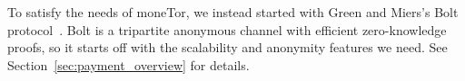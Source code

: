 To satisfy the needs of moneTor, we instead started with Green and Miers's Bolt protocol~\cite{green2017bolt}.
Bolt is a tripartite anonymous channel with efficient zero-knowledge proofs, so it starts off with the scalability and anonymity features we need.
See Section~\ref{sec:payment_overview} for details.


